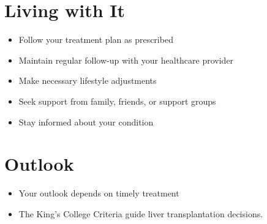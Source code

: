 \section{Living with It}
\begin{itemize}[noitemsep]
  \item Follow your treatment plan as prescribed
  \item Maintain regular follow-up with your healthcare provider
  \item Make necessary lifestyle adjustments
  \item Seek support from family, friends, or support groups
  \item Stay informed about your condition
\end{itemize}
\section{Outlook}
\begin{itemize}[noitemsep]
  \item Your outlook depends on timely treatment
  \item The King's College Criteria guide liver transplantation decisions.
\end{itemize}
